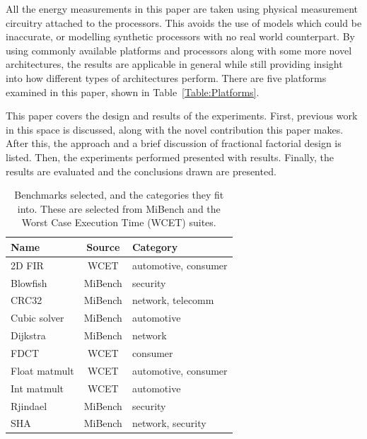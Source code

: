 \documentclass[twocolumn]{article}
\let\oldcaption\caption
\renewcommand{\caption}[1]{\oldcaption{\textup{#1}}}
\begin{document}
All the energy measurements in this paper are taken using physical measurement circuitry attached to the processors. This avoids the use of models which could be inaccurate, or modelling synthetic processors with no real world counterpart. By using commonly available platforms and processors along with some more novel architectures, the results are applicable in general while still providing insight into how different types of architectures perform. There are five platforms examined in this paper, shown in Table~\ref{Table:Platforms}.

This paper covers the design and results of the experiments. First, previous work in this space is discussed, along with the novel contribution this paper makes. After this, the approach and a brief discussion of fractional factorial design is listed. Then, the experiments performed presented with results. Finally, the results are evaluated and the conclusions drawn are presented.


\begin{table}[t]
	\centering
	\begin{tabular}{l c l}
	\textbf{Name}			& \textbf{Source} 	& \textbf{Category} \\
	\hline
	2D FIR					& WCET 		& automotive, consumer	\\
	Blowfish				& MiBench 	& security	\\
	CRC32					& MiBench 	& network, telecomm	\\
	Cubic solver			& MiBench 	& automotive	\\
	Dijkstra				& MiBench 	& network	\\
	FDCT					& WCET 		& consumer	\\
	Float matmult			& WCET 		& automotive, consumer	\\
	Int matmult				& WCET	 	& automotive	\\
	Rjindael				& MiBench 	& security	\\
	SHA						& MiBench 	& network, security	\\
	\end{tabular}
\caption{Benchmarks selected, and the categories they fit into. These are selected from MiBench\cite{MiBench} and the Worst Case Execution Time (WCET)\cite{WCET} suites.}
\label{Table:Benchmarks}
\end{table}

\end{document}
